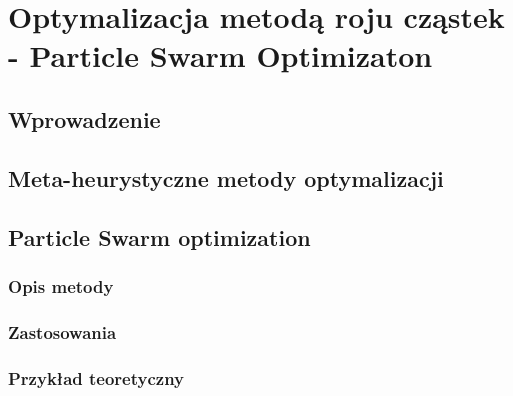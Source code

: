 \chapter{Optymalizacja metodą roju cząstek - Particle Swarm Optimizaton}
\section*{Wprowadzenie}
\section{Meta-heurystyczne metody optymalizacji}
\section{Particle Swarm optimization}
\subsection{Opis metody}
\subsection{Zastosowania}
\subsection{Przykład teoretyczny}
